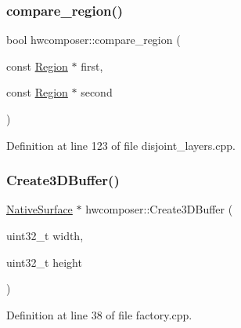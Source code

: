 \subsubsection{\texorpdfstring{compare\+\_\+region()}{compare\_region()}}
{\footnotesize\ttfamily bool hwcomposer\+::compare\+\_\+region (\begin{DoxyParamCaption}\item[{const \mbox{\hyperlink{structhwcomposer_1_1Region}{Region}} $\ast$}]{first,  }\item[{const \mbox{\hyperlink{structhwcomposer_1_1Region}{Region}} $\ast$}]{second }\end{DoxyParamCaption})}



Definition at line 123 of file disjoint\+\_\+layers.\+cpp.


\begin{DoxyCode}{0}
\end{DoxyCode}
\mbox{\label{namespacehwcomposer_a0052e66c56b527255f759b8eb871ee46}} 
\subsubsection{\texorpdfstring{Create3\+D\+Buffer()}{Create3DBuffer()}}
{\footnotesize\ttfamily \mbox{\hyperlink{classhwcomposer_1_1NativeSurface}{Native\+Surface}} $\ast$ hwcomposer\+::\+Create3\+D\+Buffer (\begin{DoxyParamCaption}\item[{uint32\+\_\+t}]{width,  }\item[{uint32\+\_\+t}]{height }\end{DoxyParamCaption})}



Definition at line 38 of file factory.\+cpp.


